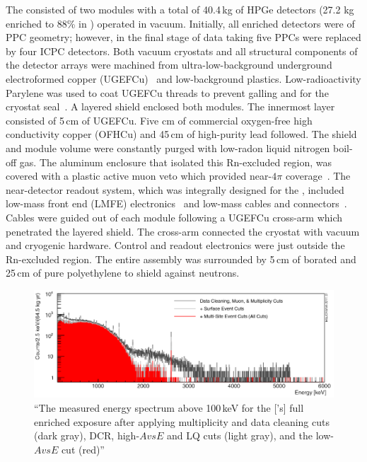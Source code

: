 The {\MJDEMit} consisted of two modules with a total of 40.4\,kg of HPGe detectors (27.2 kg enriched to 88\% in \geEn{}) operated in vacuum. Initially, all enriched detectors were of PPC geometry; however, in the final stage of data taking five PPCs were replaced by four ICPC detectors. Both vacuum cryostats and all structural components of the detector arrays were machined from ultra-low-background underground electroformed copper (UGEFCu)~\cite{ugefcu} and low-background plastics. Low-radioactivity Parylene was used to coat UGEFCu threads to prevent galling and for the cryostat seal~\cite{mjd_og}. A layered shield enclosed both modules. The innermost layer consisted of 5\,cm of UGEFCu. Five cm of commercial oxygen-free high conductivity copper (OFHCu) and 45\,cm of high-purity lead followed. The shield and module volume were constantly purged with low-radon liquid nitrogen boil-off gas. The aluminum enclosure that isolated this Rn-excluded region, was covered with a plastic active muon veto which provided near-$4\pi$ coverage~\cite{muonveto}. The near-detector readout system, which was integrally designed for the {\DEMit}, included low-mass front end (LMFE) electronics~\cite{lmfe} and low-mass cables and connectors~\cite{cables}. Cables were guided out of each module following a UGEFCu cross-arm which penetrated the layered shield. The cross-arm connected the cryostat with vacuum and cryogenic hardware. Control and readout electronics were just outside the Rn-excluded region. The entire assembly was surrounded by 5\,cm of borated and 25\,cm of pure polyethylene to shield against neutrons.
\begin{figure}[tbh]
    \centering
    \includegraphics[width=6in]{figs/0vbb/mjd_spectrum.pdf}
    \caption{``The measured energy spectrum above 100\,keV for the [{\MJDEMit}'s] full enriched exposure after applying multiplicity and data cleaning cuts (dark gray), DCR, high-$AvsE$ and LQ cuts (light gray), and the low-$AvsE$ cut (red)''~\cite{mjd_final}}
    \label{fig:mjd_spectrum}
\end{figure}

